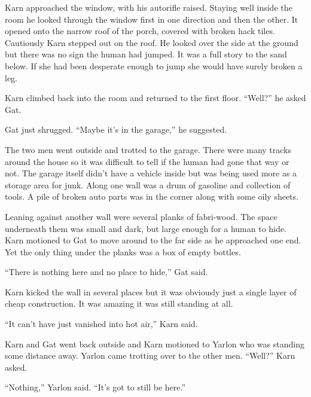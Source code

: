 Karn approached the window, with his autorifle raised. Staying well inside the room he looked
through the window first in one direction and then the other. It opened onto the narrow roof of
the porch, covered with broken hack tiles. Cautiously Karn stepped out on the roof. He looked
over the side at the ground but there was no sign the human had jumped. It was a full story to
the sand below. If she had been desperate enough to jump she would have surely broken a leg.


Karn climbed back into the room and returned to the first floor. ``Well?'' he asked Gat.

Gat just shrugged. ``Maybe it's in the garage,'' he suggested.

The two men went outside and trotted to the garage. There were many tracks around the house so
it was difficult to tell if the human had gone that way or not. The garage itself didn't have a
vehicle inside but was being used more as a storage area for junk. Along one wall was a drum of
gasoline and collection of tools. A pile of broken auto parts was in the corner along with some
oily sheets.

Leaning against another wall were several planks of fabri-wood. The space underneath them was
small and dark, but large enough for a human to hide. Karn motioned to Gat to move around to the
far side as he approached one end. Yet the only thing under the planks was a box of empty
bottles.

``There is nothing here and no place to hide,'' Gat said.

Karn kicked the wall in several places but it was obviously just a single layer of cheap
construction. It was amazing it was still standing at all.


``It can't have just vanished into hot air,'' Karn said.

Karn and Gat went back outside and Karn motioned to Yarlon who was standing some distance away.
Yarlon came trotting over to the other men. ``Well?'' Karn asked.

``Nothing,'' Yarlon said. ``It's got to still be here.''

